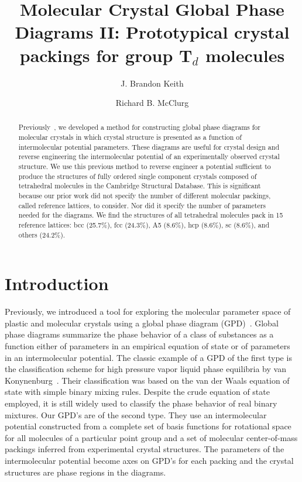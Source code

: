 \documentclass[preprint]{revtex4}              %
\begin{document}
\title{Molecular Crystal Global Phase Diagrams II: Prototypical crystal packings for group T$_d$ molecules}

\author{J. Brandon Keith}
\author{Richard B. McClurg}


\begin{abstract}
Previously~\cite{Keith04c,Mettes04}, we developed a method for
constructing global phase diagrams for molecular crystals in which
crystal structure is presented as a function of intermolecular
potential parameters. These diagrams are useful for crystal design
and reverse engineering the intermolecular potential of an
experimentally observed crystal structure. We use this previous
method to reverse engineer a potential sufficient to produce the
structures of fully ordered single component crystals composed of
tetrahedral molecules in the Cambridge Structural Database. This is
significant because our prior work did not specify the number of
different molecular packings, called reference lattices, to
consider. Nor did it specify the number of parameters needed for the
diagrams. We find the structures of all tetrahedral molecules pack
in 15 reference lattices: bcc (25.7\%), fcc (24.3\%), A5 (8.6\%),
hcp (8.6\%), sc (8.6\%), and others (24.2\%).
\end{abstract}

\maketitle                        %

\section{Introduction}

Previously, we introduced a tool for exploring the molecular
parameter space of plastic and molecular crystals using a global
phase diagram (GPD)~\cite{Keith04c,Mettes04}. Global phase diagrams
summarize the phase behavior of a class of substances as a function
either of parameters in an empirical equation of state or of
parameters in an intermolecular potential. The classic example of a
GPD of the first type is the classification scheme for high pressure
vapor liquid phase equilibria by van
Konynenburg~\cite{VanKonynenburg80}. Their classification was based
on the van der Waals equation of state with simple binary mixing
rules. Despite the crude equation of state employed, it is still
widely used to classify the phase behavior of real binary mixtures.
Our GPD's are of the second type. They use an intermolecular
potential constructed from a complete set of basis functions for
rotational space for all molecules of a particular point group and a
set of molecular center-of-mass packings inferred from experimental
crystal structures. The parameters of the intermolecular potential
become axes on GPD's for each packing and the crystal structures are
phase regions in the diagrams.
\end{document}
